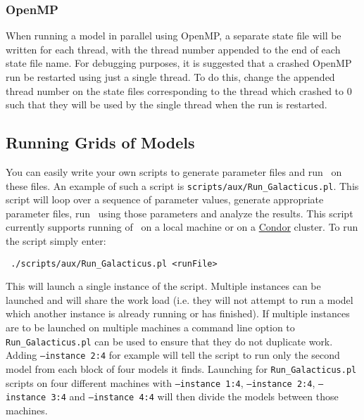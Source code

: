 \subsubsection{OpenMP}

When running a model in parallel using OpenMP, a separate state file will be written for each thread, with the thread number appended to the end of each state file name. For debugging purposes, it is suggested that a crashed OpenMP run be restarted using just a single thread. To do this, change the appended thread number on the state files corresponding to the thread which crashed to 0 such that they will be used by the single thread when the run is restarted.

\subsection{Running Grids of Models}\label{sec:RunningGrids}

You can easily write your own scripts to generate parameter files and run \glc\ on these files. An example of such a script is {\tt scripts/aux/Run\_Galacticus.pl}. This script will loop over a sequence of parameter values, generate appropriate parameter files, run \glc\ using those parameters and analyze the results. This script currently supports running of \glc\ on a local machine or on a \href{http://www.cs.wisc.edu/condor/}{{\sc Condor}} cluster. To run the script simply enter:
\begin{verbatim}
 ./scripts/aux/Run_Galacticus.pl <runFile>
\end{verbatim}
This will launch a single instance of the script. Multiple instances can be launched and will share the work load (i.e. they will not attempt to run a model which another instance is already running or has finished). If multiple instances are to be launched on multiple machines a command line option to {\tt Run\_Galacticus.pl} can be used to ensure that they do not duplicate work. Adding {\tt --instance 2:4} for example will tell the script to run only the second model from each block of four models it finds. Launching for {\tt Run\_Galacticus.pl} scripts on four different machines with {\tt --instance 1:4}, {\tt --instance 2:4}, {\tt --instance 3:4} and {\tt --instance 4:4} will then divide the models between those machines.

